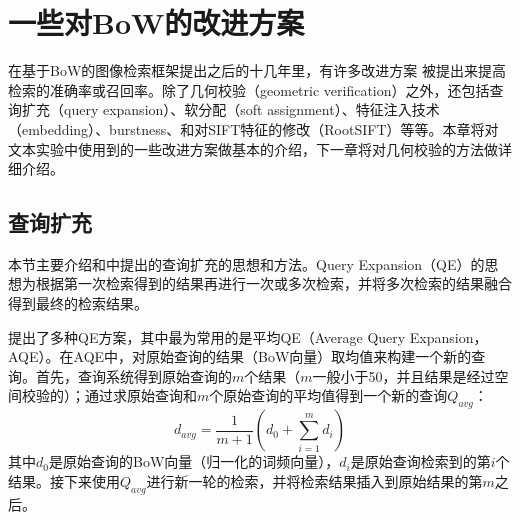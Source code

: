 \section{一些对BoW的改进方案}
在基于BoW的图像检索框架提出之后的十几年里，有许多改进方案\cite{philbin2007object}\cite{philbin2008lost}\cite{chum2007total}\cite{jegou2008hamming}\cite{turcot2009better}
\cite{zheng2014bayes}\cite{zheng2014packing}\cite{knopp2010asvoiding}\cite{zhou2011large}被提出来提高检索的准确率或召回率。除了几何校验（geometric verification）之外，还包括查询扩充（query expansion）\cite{chum2007total}\cite{shen2012Object}、软分配（soft assignment）\cite{philbin2008lost}、特征注入技术（embedding）\cite{jegou2008hamming}\cite{jegou2014triangulation}、burstness\cite{jegou2009burstiness}\cite{shi2015early}、和对SIFT特征的修改（RootSIFT）\cite{arandjelovic2012three}等等。本章将对文本实验中使用到的一些改进方案做基本的介绍，下一章将对几何校验的方法做详细介绍。

\subsection{查询扩充}
本节主要介绍\cite{chum2007total}和\cite{shen2012Object}中提出的查询扩充的思想和方法。Query Expansion（QE）的思想为根据第一次检索得到的结果再进行一次或多次检索，并将多次检索的结果融合得到最终的检索结果。

\cite{chum2007total}提出了多种QE方案，其中最为常用的是平均QE（Average Query Expansion，AQE）。在AQE中，对原始查询的结果（BoW向量）取均值来构建一个新的查询。首先，查询系统得到原始查询的$m$个结果（$m$一般小于50，并且结果是经过空间校验的）；通过求原始查询和$m$个原始查询的平均值得到一个新的查询$Q_{avg}$：
\begin{equation}
d_{avg}= \frac{1}{m+1}(d_0+\sum_{i=1}^{m}d_i)
\end{equation}
其中$d_0$是原始查询的BoW向量（归一化的词频向量），$d_i$是原始查询检索到的第$i$个结果。接下来使用$Q_{avg}$进行新一轮的检索，并将检索结果插入到原始结果的第$m$之后。

